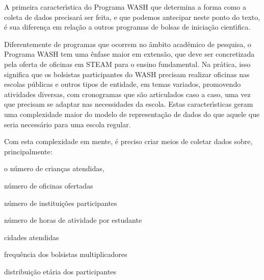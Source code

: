 \documentclass[
12pt,		%
openright,	%
twoside,  %
a4paper,			%
chapter=TITLE,		%
english,			%
french,				%
spanish,			%
brazil				%
]{USPSC-classe/USPSC}
\begin{document}
A primeira caracter\'{\i}stica do Programa WASH que determina a forma como a coleta de dados precisar\'a ser feita, e que podemos antecipar neste ponto do texto, \'e sua diferen\c{c}a em rela\c{c}\~ao a outros programas de bolsas de inicia\c{c}\~ao cient\'{\i}fica.

















Diferentemente de programas que ocorrem no \^ambito acad\^emico de pesquisa, o Programa WASH tem uma \^enfase maior em extens\~ao, que deve ser concretizada pela oferta de oficinas em STEAM para o ensino fundamental. Na pr\'atica, isso significa que os bolsistas participantes do WASH precisam realizar oficinas nas escolas p\'ublicas e outros tipos de entidade, em temas variados, promovendo atividades diversas, com cronogramas que s\~ao articulados caso a caso, uma vez que precisam se adaptar nas necessidades da escola. Estas caracter\'{\i}sticas geram uma complexidade maior do modelo de representa\c{c}\~ao de dados do que aquele que seria necess\'ario para uma escola regular.

















Com esta complexidade em mente, \'e preciso criar meios de coletar dados sobre, principalmente:


















\begin{alineas}
\item o n\'umero de crian\c{c}as atendidas,
\item n\'umero de oficinas ofertadas
\item n\'umero de institui\c{c}\~oes participantes
\item n\'umero de horas de atividade por estudante
\item cidades atendidas
\item frequ\^encia dos bolsistas multiplicadores
\item distribui\c{c}\~ao et\'aria dos participantes
\end{alineas}
\end{document}
